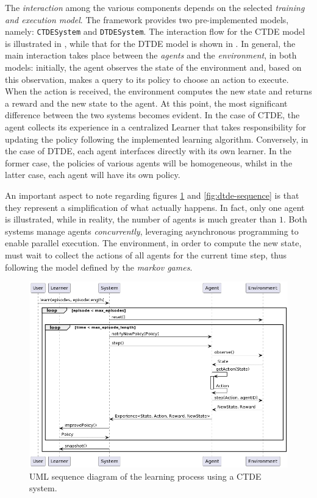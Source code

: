 \documentclass[12pt,a4paper,openright,twoside]{book}
\begin{document}
The \emph{interaction} among the various components depends on the selected \emph{training and execution model}. 
    The framework provides two pre-implemented models, namely: \texttt{CTDESystem} and \texttt{DTDESystem}. 
    The interaction flow for the CTDE model is illustrated in , while that for the DTDE model is shown in
    . In general, the main interaction takes place between the \emph{agents} and the \emph{environment}, in both models: 
    initially, the agent observes the state of the environment and, based on this observation, 
    makes a query to its policy to choose an action to execute. When the action is received, the environment computes 
    the new state and returns a reward and the new state to the agent.
    At this point, the most significant difference between the two systems becomes evident. In the case of CTDE, the agent collects its experience 
    in a centralized Learner that takes responsibility for updating the policy following the implemented learning algorithm. Conversely, in the case of 
    DTDE, each agent interfaces directly with its own learner. In the former case, the policies of various agents will be homogeneous, 
    whilst in the latter case, each agent will have its own policy.

An important aspect to note regarding figures \ref{fig:ctde-sequence} and \ref{fig:dtde-sequence} is that they represent a simplification of what actually happens. 
    In fact, only one agent is illustrated, while in reality, the number of agents is much greater than $1$. Both systems manage agents \emph{concurrently}, 
    leveraging asynchronous programming to enable parallel execution. The environment, in order to compute the new state,
    must wait to collect the actions of all agents for the current time step, thus following the model defined by
    the \emph{markov games}\cite{LITTMAN1994157}. 

\begin{figure}[t]
    \centering
    \includegraphics[width=\textwidth]{figures/CTDE-System-Sequence-Diagram.png}
    \caption{UML sequence diagram of the learning process using a CTDE system.}
    \label{fig:ctde-sequence}
\end{figure}
\end{document}
